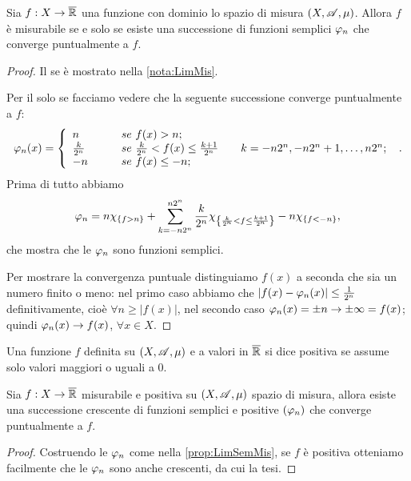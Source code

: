 \begin{proposition}\label{prop:LimSemMis}
	Sia $f:X \rightarrow \overline{\mathbb R}$ una funzione con dominio lo spazio di misura $(X,\mathscr A,\mu)$.
	Allora $f$ è misurabile se e solo se esiste una successione di funzioni semplici $\varphi_n$ che converge puntualmente a $f$.
\end{proposition}
\begin{proof}
	Il se è mostrato nella \cref{nota:LimMis}.
	
	Per il solo se facciamo vedere che la seguente successione converge puntualmente a $f$:
	\[
		\varphi_n(x) =
		\left\{ \begin{array}{ll}
			n &\qquad se\ f(x)>n;\\
			\frac{k}{2^n} &\qquad se\ \frac{k}{2^n}<f(x)\le \frac{k+1}{2^n} \qquad k=-n2^n,-n2^n+1,\dots,n2^n;\\
			-n &\qquad se\ f(x)\le-n;
		\end{array} \right.\ .
	\]
	Prima di tutto abbiamo 
	\[\varphi_n=
		n\chi_{\{f>n\}}+
		\sum_{k=-n2^n}^{n2^n}\frac{k}{2^n}\chi_{\left\{ \frac{k}{2^n}<f\le \frac{k+1}{2^n} \right\}}
		-n\chi_{\{f<-n\}},
	\]
	che mostra che le $\varphi_n$ sono funzioni semplici.
	
	Per mostrare la convergenza puntuale distinguiamo $f(x)$ a seconda che sia un numero finito o meno:
	nel primo caso abbiamo che $|f(x)-\varphi_n(x)|\le \frac{1}{2^n}$ definitivamente, cioè $\forall n\ge |f(x)|$,
	nel secondo caso $\varphi_n(x)=\pm n\rightarrow \pm\infty = f(x)$;
	quindi $\varphi_n(x)\rightarrow f(x)$, $\forall x\in X$.
\end{proof}

\begin{definition}
	Una funzione $f$ definita su $(X,\mathscr A,\mu)$ e a valori in $\overline{\mathbb R}$ si dice positiva se assume solo valori maggiori o uguali a 0.
\end{definition}


\begin{corollary}\label{cor:LimSemCrescMis}
	Sia $f:X\rightarrow \overline{\mathbb R}$ misurabile e positiva su $(X,\mathscr A,\mu)$ spazio di misura, allora esiste una successione crescente di funzioni semplici e positive $(\varphi_n)$ che converge puntualmente a $f$.
\end{corollary}
\begin{proof}
	Costruendo le $\varphi_n$ come nella \cref{prop:LimSemMis}, se $f$ è positiva otteniamo facilmente che le $\varphi_n$ sono anche crescenti, da cui la tesi.
\end{proof}

